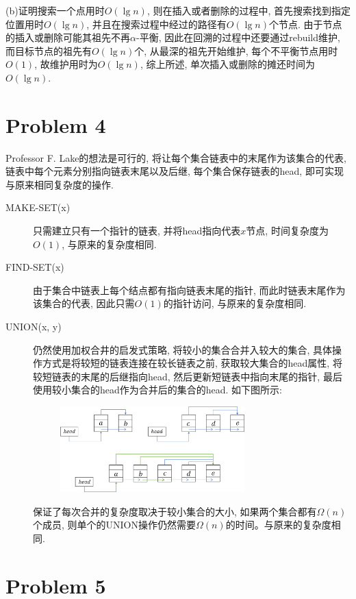 \documentclass{article}
\begin{document}
(b)证明搜索一个点用时$O(\lg n)$, 则在插入或者删除的过程中, 首先搜索找到指定位置用时$O(\lg n)$, 并且在搜索过程中经过的路径有$O(\lg n)$个节点. 由于节点的插入或删除可能其祖先不再$\alpha$-平衡, 因此在回溯的过程中还要通过rebuild维护, 而目标节点的祖先有$O(\lg n)$个, 从最深的祖先开始维护, 每个不平衡节点用时$O(1)$, 故维护用时为$O(\lg n)$, 综上所述, 单次插入或删除的摊还时间为$O(\lg n)$.

\section{Problem 4}

Professor F. Lake的想法是可行的, 将让每个集合链表中的末尾作为该集合的代表, 链表中每个元素分别指向链表末尾以及后继, 每个集合保存链表的head, 即可实现与原来相同复杂度的操作.

\begin{description}
    \item[MAKE-SET(x)] 只需建立只有一个指针的链表, 并将head指向代表$x$节点, 时间复杂度为$O(1)$, 与原来的复杂度相同.
    \item[FIND-SET(x)] 由于集合中链表上每个结点都有指向链表末尾的指针, 而此时链表末尾作为该集合的代表, 因此只需$O(1)$的指针访问, 与原来的复杂度相同.
    \item[UNION(x, y)] 仍然使用加权合井的启发式策略, 将较小的集合合并入较大的集合, 具体操作方式是将较短的链表连接在较长链表之前, 获取较大集合的head属性, 将较短链表的末尾的后继指向head, 然后更新短链表中指向末尾的指针, 最后使用较小集合的head作为合并后的集合的head. 如下图所示:
    \begin{figure}[H]
        \centering
        \includegraphics[width=0.7\textwidth]{1.png}
    \end{figure}
    保证了每次合并的复杂度取决于较小集合的大小, 如果两个集合都有$\Omega (n)$个成员, 则单个的UNION操作仍然需要$\Omega (n)$的时间。与原来的复杂度相同.
\end{description}

\section{Problem 5}
\end{document}
